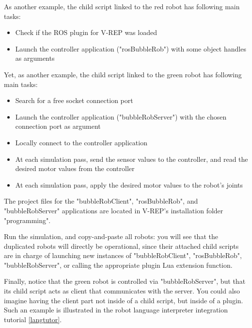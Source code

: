 As another example, the child script linked to the red robot has following 
main tasks:
\begin{itemize}[nosep]
	\item Check if the ROS plugin for V-REP was loaded
	\item Launch the controller application ("rosBubbleRob") with some object
		handles as arguments
\end{itemize}

Yet, as another example, the child script linked to the green robot has 
following main tasks:
\begin{itemize}[nosep]
	\item Search for a free socket connection port
	\item Launch the controller application ("bubbleRobServer") with the 
		chosen connection port as argument
	\item Locally connect to the controller application
	\item At each simulation pass, send the sensor values to the controller, 
		and read the desired motor values from the controller
	\item At each simulation pass, apply the desired motor values to
		the robot's joints
\end{itemize}

The project files for the "bubbleRobClient", "rosBubbleRob", and
"bubbleRobServer" applications are located in V-REP's installation 
folder "programming".

Run the simulation, and copy-and-paste all robots: you will see that the 
duplicated robots will directly be operational, since their attached child 
scripts are in charge of launching new instances of "bubbleRobClient", 
"rosBubbleRob", "bubbleRobServer", or calling the appropriate plugin Lua
extension function.

Finally, notice that the green robot is controlled via "bubbleRobServer", 
but that its child script acts as client that communicates with the server. 
You could also imagine having the client part not inside of a child script, 
but inside of a plugin. Such an example is illustrated in the robot 
language interpreter integration tutorial \ref{langtutor}.







\secup

